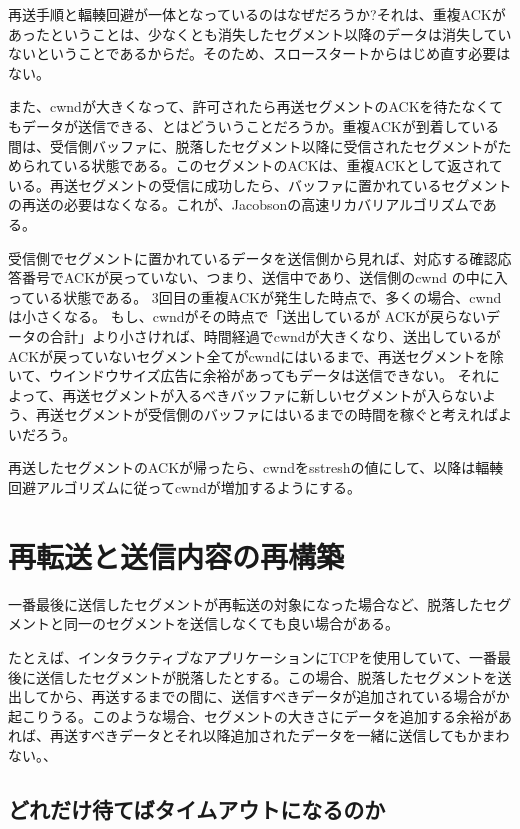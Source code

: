 再送手順と輻輳回避が一体となっているのはなぜだろうか?それは、重複ACKがあったということは、少なくとも消失したセグメント以降のデータは消失していないということであるからだ。そのため、スロースタートからはじめ直す必要はない。

また、cwndが大きくなって、許可されたら再送セグメントのACKを待たなくてもデータが送信できる、とはどういうことだろうか。重複ACKが到着している間は、受信側バッファに、脱落したセグメント以降に受信されたセグメントがためられている状態である。このセグメントのACKは、重複ACKとして返されている。再送セグメントの受信に成功したら、バッファに置かれているセグメントの再送の必要はなくなる。これが、Jacobsonの高速リカバリアルゴリズムである。

受信側でセグメントに置かれているデータを送信側から見れば、対応する確認応答番号でACKが戻っていない、つまり、送信中であり、送信側のcwnd の中に入っている状態である。
3回目の重複ACKが発生した時点で、多くの場合、cwndは小さくなる。
もし、cwndがその時点で「送出しているが ACKが戻らないデータの合計」より小さければ、時間経過でcwndが大きくなり、送出しているがACKが戻っていないセグメント全てがcwndにはいるまで、再送セグメントを除いて、ウインドウサイズ広告に余裕があってもデータは送信できない。
それによって、再送セグメントが入るべきバッファに新しいセグメントが入らないよう、再送セグメントが受信側のバッファにはいるまでの時間を稼ぐと考えればよいだろう。

再送したセグメントのACKが帰ったら、cwndをsstreshの値にして、以降は輻輳回避アルゴリズムに従ってcwndが増加するようにする。

\section{再転送と送信内容の再構築}

一番最後に送信したセグメントが再転送の対象になった場合など、脱落したセグメントと同一のセグメントを送信しなくても良い場合がある。

たとえば、インタラクティブなアプリケーションにTCPを使用していて、一番最後に送信したセグメントが脱落したとする。この場合、脱落したセグメントを送出してから、再送するまでの間に、送信すべきデータが追加されている場合がか起こりうる。このような場合、セグメントの大きさにデータを追加する余裕があれば、再送すべきデータとそれ以降追加されたデータを一緒に送信してもかまわない。、

\subsection{どれだけ待てばタイムアウトになるのか}

